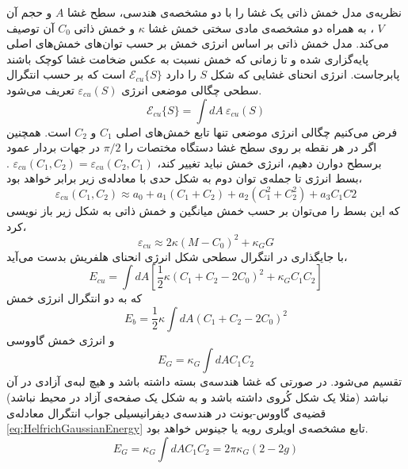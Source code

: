 نظریه‌ی مدل خمش ذاتی
یک غشا را با دو مشخصه‌ی هندسی، سطح غشا 
$A$
و حجم آن 
$V$
، به همراه دو مشخصه‌ی مادی
سختی خمش غشا
$\kappa$
و خمش ذاتی 
$C_0$
آن توصیف می‌کند. مدل خمش ذاتی بر اساس انرژی خمش بر حسب توان‌های خمش‌های اصلی پایه‌گزاری شده و تا زمانی که خمش نسبت به عکس ضخامت غشا کوچک باشند پابرجاست.
انرژی انحنای غشایی که شکل 
$S$
را دارد 
$\mathcal{E}_{cu}\{S\}$
است که بر حسب انتگرال سطحی چگالی موضعی انرژی 
$\varepsilon_{cu}(S)$
تعریف می‌شود.
\begin{equation}
\mathcal{E}_{cu}\{S\}=\int dA~\varepsilon_{cu}(S)
\end{equation}
فرض می‌کنیم چگالی انرژی موضعی تنها تابع خمش‌های اصلی 
$C_1$
و
$C_2$
است. همچنین اگر در هر نقطه بر روی سطح غشا دستگاه مختصات را 
$\pi/2$
در جهات بردار عمود برسطح دوارن دهیم، انرژی خمش نباید تغییر کند،
$\varepsilon_{cu}(C_1,C_2)=\varepsilon_{cu}(C_2,C_1)$
. بسط انرژی تا جمله‌ی توان دوم به شکل حدی با معادله‌ی زیر برابر خواهد بود،
\begin{equation}
\varepsilon_{cu}(C_1,C_2)\approx a_0+a_1(C_1+C_2)+a_2(C_1^2+C_2^2) + a_3 C_1C2
\end{equation}
که این بسط را می‌توان بر حسب خمش میانگین و خمش ذاتی به شکل زیر باز نویسی کرد،
\begin{equation}
\varepsilon_{cu}\approx 2\kappa(M-C_0)^2+\kappa_GG
\end{equation}
با جایگذاری در انتگرال سطحی شکل انرژی انحنای هلفریش
\cite{Helfrich1973}
بدست می‌آید،
\begin{equation}
E_{cu}=\int dA\left[\frac{1}{2}\kappa(C_1+C_2-2C_0)^2+\kappa_GC_1C_2\right]
\label{eq:HelfrichCurvatureEnergy}
\end{equation}
که به دو انتگرال انرژی خمش 
\begin{equation}
E_{b}=\frac{1}{2}\kappa\int dA (C_1+C_2-2C_0)^2
\label{eq:HelfrichBendingEnergy}
\end{equation}
و انرژی خمش گاووسی
\begin{equation}
E_{G}=\kappa_G\int dA C_1C_2
\label{eq:HelfrichGaussianEnergy}
\end{equation}
تقسیم می‌شود.
در صورتی که غشا هندسه‌ی بسته داشته باشد و هیچ لبه‌ی آزادی در آن نباشد (مثلا یک شکل کُروی داشته باشد و به شکل یک صفحه‌ی آزاد در محیط نباشد) قضیه‌ی گاووس-بونت
\cite{NelsonBook2004}
در هندسه‌ی دیفرانیسیلی جواب انتگرال معادله‌ی
\ref{eq:HelfrichGaussianEnergy}
 تابع مشخصه‌ی اویلری رویه
 یا جینوس
خواهد بود.
 \begin{equation}
E_{G}=\kappa_G\int dA C_1C_2=2\pi\kappa_G(2-2g)
\label{eq:GaussianBonnet}
\end{equation}
 
